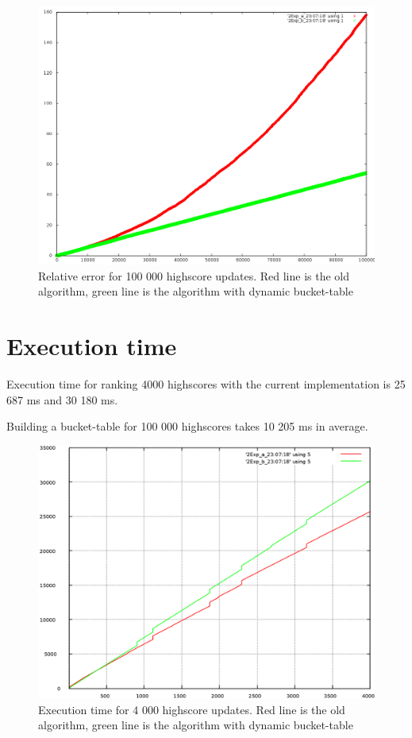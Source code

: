 \begin{figure}[h!]
  \centering
  \caption{Relative error for 100 000 highscore updates. Red line is the old algorithm, green line is the algorithm with dynamic bucket-table}
  \label{fig:relerror}
  \includegraphics[width=12cm]{img/relative}
\end{figure}

\section{Execution time}

Execution time for ranking 4000 highscores with the current implementation is 25 687 ms and 30 180 ms. 

Building a bucket-table for 100 000 highscores takes 10 205 ms in average. 

\begin{figure}[h!]
  \centering
  \caption{Execution time for 4 000 highscore updates. Red line is the old algorithm, green line is the algorithm with dynamic bucket-table}
  \label{fig:relerror}
  \includegraphics[width=12cm]{img/exec-time} 
\end{figure}

